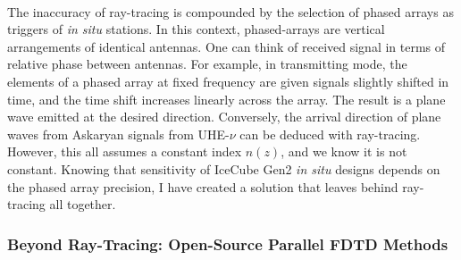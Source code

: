 \documentclass[../../../main.tex]{subfiles}
\begin{document}
\\
\vspace{0.25cm}
The inaccuracy of ray-tracing is compounded by the selection of phased arrays as triggers of \textit{in situ} stations.  In this context, phased-arrays are vertical arrangements of identical antennas.  One can think of received signal in terms of relative phase between antennas.  For example, in transmitting mode, the elements of a phased array at fixed frequency are given signals slightly shifted in time, and the time shift increases linearly across the array.  The result is a plane wave emitted at the desired direction.  Conversely, the arrival direction of plane waves from Askaryan signals from UHE-$\nu$ can be deduced with ray-tracing. However, this all assumes a constant index $n(z)$, and we know it is not constant.  Knowing that sensitivity of IceCube Gen2 \textit{in situ} designs depends on the phased array precision, I have created a solution that leaves behind ray-tracing all together.

\subsubsection{Beyond Ray-Tracing: Open-Source Parallel FDTD Methods}
\end{document}
